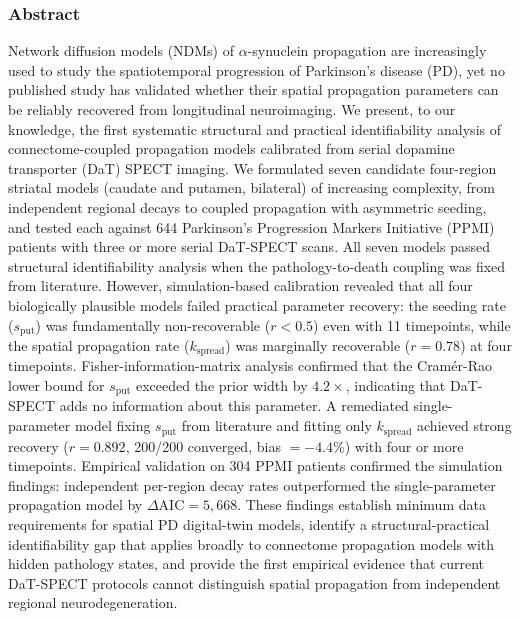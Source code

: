 

\subsubsection*{Abstract}

\noindent
Network diffusion models (NDMs) of $\alpha$-synuclein propagation are increasingly used to study the spatiotemporal progression of Parkinson's disease (PD), yet no published study has validated whether their spatial propagation parameters can be reliably recovered from longitudinal neuroimaging. We present, to our knowledge, the first systematic structural and practical identifiability analysis of connectome-coupled propagation models calibrated from serial dopamine transporter (DaT) SPECT imaging. We formulated seven candidate four-region striatal models (caudate and putamen, bilateral) of increasing complexity, from independent regional decays to coupled propagation with asymmetric seeding, and tested each against 644 Parkinson's Progression Markers Initiative (PPMI) patients with three or more serial DaT-SPECT scans. All seven models passed structural identifiability analysis when the pathology-to-death coupling was fixed from literature. However, simulation-based calibration revealed that all four biologically plausible models failed practical parameter recovery: the seeding rate ($s_{\text{put}}$) was fundamentally non-recoverable ($r < 0.5$) even with 11 timepoints, while the spatial propagation rate ($k_{\text{spread}}$) was marginally recoverable ($r = 0.78$) at four timepoints. Fisher-information-matrix analysis confirmed that the Cram\'{e}r-Rao lower bound for $s_{\text{put}}$ exceeded the prior width by $4.2\times$, indicating that DaT-SPECT adds no information about this parameter. A remediated single-parameter model fixing $s_{\text{put}}$ from literature and fitting only $k_{\text{spread}}$ achieved strong recovery ($r = 0.892$, 200/200 converged, bias $= -4.4$\%) with four or more timepoints. Empirical validation on 304 PPMI patients confirmed the simulation findings: independent per-region decay rates outperformed the single-parameter propagation model by $\Delta$AIC$=5{,}668$. These findings establish minimum data requirements for spatial PD digital-twin models, identify a structural-practical identifiability gap that applies broadly to connectome propagation models with hidden pathology states, and provide the first empirical evidence that current DaT-SPECT protocols cannot distinguish spatial propagation from independent regional neurodegeneration.

